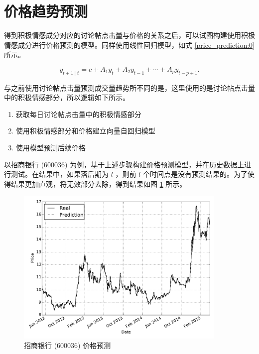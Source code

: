 \section{价格趋势预测}

得到积极情感成分对应的讨论帖点击量与价格的关系之后，可以试图构建使用积极情感成分进行价格预测的模型。同样使用线性回归模型，如式 \ref{price_prediction:0} 所示。

\begin{equation}
  \label{price_prediction:0}
  y_{t+1\mid t}=c+A_{1}y_{t}+A_{2}y_{t-1}+\cdots +A_{p}y_{t-p+1}.
\end{equation}

与之前使用讨论帖点击量预测成交量趋势所不同的是，这里使用的是讨论帖点击量中的积极情感部分，所以逻辑如下所示。

\begin{enumerate}
  \item 获取每日讨论帖点击量中的积极情感部分
  \item 使用积极情感部分和价格建立向量自回归模型
  \item 使用模型预测后续价格
\end{enumerate}

以招商银行 (600036) 为例，基于上述步骤构建价格预测模型，并在历史数据上进行测试。在结果中，如果落后期为 $l$ ，则前 $l$ 个时间点是没有预测结果的。为了使得结果更加直观，将无效部分去除，得到结果如图 \ref{price_prediction:1} 所示。

\begin{figure}
  \centering
  \includegraphics[width=0.9\textwidth]{plots/positive_click_count_forecast_price.pdf}
  \caption{招商银行 (600036) 价格预测}
  \label{price_prediction:1}
\end{figure}

